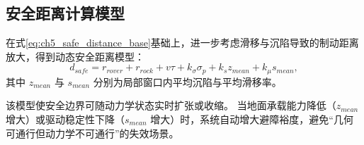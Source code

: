 \subsection{安全距离计算模型}
\label{subsec:ch5_safe_distance_model}

在式\eqref{eq:ch5_safe_distance_base}基础上，进一步考虑滑移与沉陷导致的制动距离放大，得到动态安全距离模型：
\begin{equation}
d_{safe}=r_{rover}+r_{rock}+v\tau+k_\sigma \sigma_p+k_s z_{mean}+k_\mu s_{mean},
\label{eq:ch5_safe_distance_dynamic}
\end{equation}
其中 $z_{mean}$ 与 $s_{mean}$ 分别为局部窗口内平均沉陷与平均滑移率。

该模型使安全边界可随动力学状态实时扩张或收缩。
当地面承载能力降低（$z_{mean}$ 增大）或驱动稳定性下降（$s_{mean}$ 增大）时，系统自动增大避障裕度，避免“几何可通行但动力学不可通行”的失效场景。
